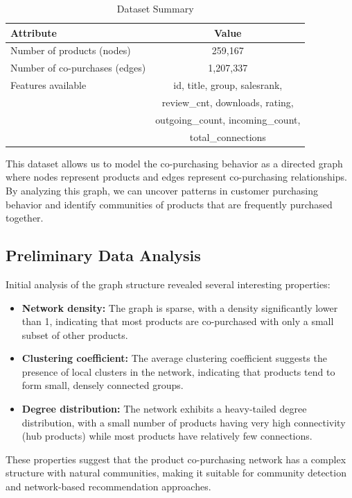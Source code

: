 \documentclass[conference]{IEEEtran}
\begin{document}
\begin{table}[ht]
\centering
\caption{Dataset Summary}
\label{tab:data-summary}
\begin{tabular}{lc}
\toprule
\textbf{Attribute} & \textbf{Value} \\
\midrule
Number of products (nodes) & 259,167 \\
Number of co-purchases (edges) & 1,207,337 \\
Features available & id, title, group, salesrank, \\
 & review\_cnt, downloads, rating, \\
 & outgoing\_count, incoming\_count, \\
 & total\_connections \\
\bottomrule
\end{tabular}
\end{table}

This dataset allows us to model the co-purchasing behavior as a directed graph where nodes represent products and edges represent co-purchasing relationships. By analyzing this graph, we can uncover patterns in customer purchasing behavior and identify communities of products that are frequently purchased together.

\subsection{Preliminary Data Analysis}
Initial analysis of the graph structure revealed several interesting properties:

\begin{itemize}
    \item \textbf{Network density:} The graph is sparse, with a density significantly lower than 1, indicating that most products are co-purchased with only a small subset of other products.
    
    \item \textbf{Clustering coefficient:} The average clustering coefficient suggests the presence of local clusters in the network, indicating that products tend to form small, densely connected groups.
    
    \item \textbf{Degree distribution:} The network exhibits a heavy-tailed degree distribution, with a small number of products having very high connectivity (hub products) while most products have relatively few connections.
\end{itemize}

These properties suggest that the product co-purchasing network has a complex structure with natural communities, making it suitable for community detection and network-based recommendation approaches.
\end{document}
